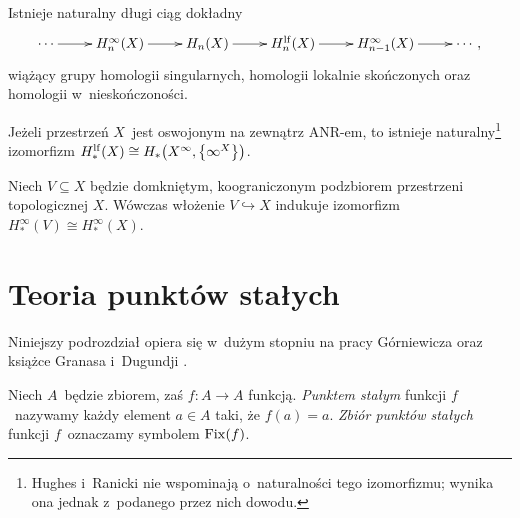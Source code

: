 \begin{stw}\label{stw-ciag_dokladny_homologii}
Istnieje naturalny długi ciąg dokładny
\[\xymatrix{\cdots\ar[r] & H_n^\infty(X)\ar[r]& H_n(X)\ar[r] & H_n^{\lf}(X)\ar[r] & H_{n-1}^\infty(X)\ar[r] & \cdots,}\]
wiążący grupy homologii singularnych, homologii lokalnie skończonych oraz homologii w~nieskończoności.
\end{stw}

\begin{tw}\label{tw-ranicki-hughes-izo-miedzy-homologiami-lf-a-uzwarcenia}
Jeżeli przestrzeń $X$~jest oswojonym na zewnątrz ANR-em, to istnieje naturalny\footnote{Hughes i~Ranicki \cite[Proposition 7.15]{Hughes96} nie wspominają o~naturalności tego izomorfizmu; wynika ona jednak z~podanego przez nich dowodu.} izomorfizm $H_*^{\mathrm{lf}}(X)\cong H_*\bigl(X^\infty,\bigl\{\infty^X\bigr\}\bigr)$.
\end{tw}

\begin{lem}\label{lem-wlozenie_kozwartego_indukuje_izomorfizm}
Niech $V\subseteq X$ będzie domkniętym, koograniczonym podzbiorem przestrzeni topologicznej $X$. Wówczas włożenie $V\hookrightarrow X$ indukuje izomorfizm $H_*^\infty(V)\cong H_*^\infty(X)$.
\end{lem}









\section{Teoria punktów stałych}\label{sec-fixed_point_theory}
Niniejszy podrozdział opiera się w~dużym stopniu na pracy Górniewicza \cite{Gorniewicz05} oraz książce Granasa i~Dugundji \cite{Granas03}.

Niech $A$~będzie zbiorem, zaś $f\colon A\to A$ funkcją. \textit{Punktem stałym} funkcji $f$~nazywamy każdy element $a\in A$ taki, że $f(a)=a$. \textit{Zbiór punktów stałych} funkcji $f$~oznaczamy symbolem $\operatorname{Fix}(f)$.

